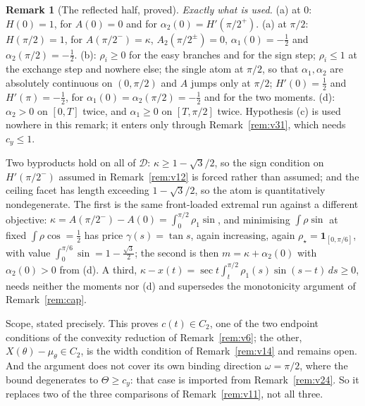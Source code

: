 \documentclass[11pt]{article}
\theoremstyle{definition}
\newtheorem{remark}[theorem]{Remark}
\begin{document}
\begin{remark}[The reflected half, proved]
\emph{Exactly what is used.} (a) at $0$: $H(0)=1$, for $A(0)=0$ and for
$\alpha_2(0)=H'(\pi/2^+)$. (a) at $\pi/2$: $H(\pi/2)=1$, for $A(\pi/2^-)=\kappa$,
$A_2(\pi/2^\pm)=0$, $\alpha_1(0)=-\tfrac12$ and $\alpha_2(\pi/2)=-\tfrac12$. (b): $\rho_i\ge0$
for the easy branches and for the sign step; $\rho_i\le1$ at the exchange step and nowhere
else; the single atom at $\pi/2$, so that $\alpha_1,\alpha_2$ are absolutely continuous on
$(0,\pi/2)$ and $A$ jumps only at $\pi/2$; $H'(0)=\tfrac12$ and $H'(\pi)=-\tfrac12$, for
$\alpha_1(0)=\alpha_2(\pi/2)=-\tfrac12$ and for the two moments. (d): $\alpha_2>0$ on $[0,T]$
twice, and $\alpha_1\ge0$ on $[T,\pi/2]$ twice. Hypothesis (c) is used nowhere in this
remark; it enters only through Remark~\ref{rem:v31}, which needs $c_y\le1$.

Two byproducts hold on all of $\mathcal D$: $\kappa\ge1-\sqrt3/2$, so the sign condition on
$H'(\pi/2^-)$ assumed in Remark~\ref{rem:v12} is forced rather than assumed; and the ceiling
facet has length exceeding $1-\sqrt3/2$, so the atom is quantitatively nondegenerate. The
first is the same front-loaded extremal run against a different objective:
$\kappa=A(\pi/2^-)-A(0)=\int_0^{\pi/2}\rho_1\sin$, and minimising $\int\rho\sin$ at fixed
$\int\rho\cos=\tfrac12$ has price $\gamma(s)=\tan s$, again increasing, again
$\rho_\star=\mathbf 1_{[0,\pi/6]}$, with value $\int_0^{\pi/6}\sin=1-\tfrac{\sqrt3}2$; the
second is then $m=\kappa+\alpha_2(0)$ with $\alpha_2(0)>0$ from (d). A third,
$\kappa-x(t)=\sec t\int_t^{\pi/2}\rho_1(s)\sin(s-t)\,ds\ge0$, needs neither the moments nor
(d) and supersedes the monotonicity argument of Remark~\ref{rem:cap}.

Scope, stated precisely. This proves $c(t)\in C_2$, one of the two endpoint conditions of the
convexity reduction of Remark~\ref{rem:v6}; the other, $X(\theta)-\mu_\theta\in C_2$, is the
width condition of Remark~\ref{rem:v14} and remains open. And the argument does not cover its
own binding direction $\omega=\pi/2$, where the bound degenerates to $\Theta\ge c_y$: that case
is imported from Remark~\ref{rem:v24}. So it replaces two of the three comparisons of
Remark~\ref{rem:v11}, not all three.


\end{remark}
\end{document}
